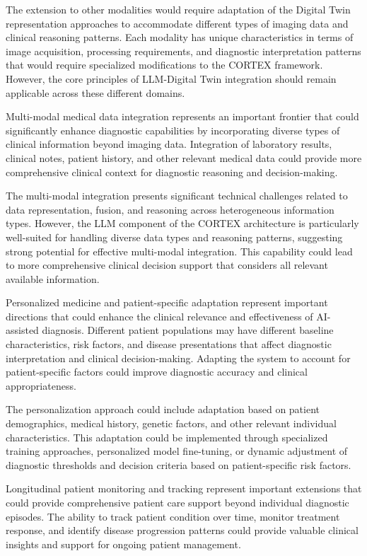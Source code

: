 The extension to other modalities would require adaptation of the Digital Twin representation approaches to accommodate different types of imaging data and clinical reasoning patterns. Each modality has unique characteristics in terms of image acquisition, processing requirements, and diagnostic interpretation patterns that would require specialized modifications to the CORTEX framework. However, the core principles of LLM-Digital Twin integration should remain applicable across these different domains.

Multi-modal medical data integration represents an important frontier that could significantly enhance diagnostic capabilities by incorporating diverse types of clinical information beyond imaging data. Integration of laboratory results, clinical notes, patient history, and other relevant medical data could provide more comprehensive clinical context for diagnostic reasoning and decision-making.

The multi-modal integration presents significant technical challenges related to data representation, fusion, and reasoning across heterogeneous information types. However, the LLM component of the CORTEX architecture is particularly well-suited for handling diverse data types and reasoning patterns, suggesting strong potential for effective multi-modal integration. This capability could lead to more comprehensive clinical decision support that considers all relevant available information.

Personalized medicine and patient-specific adaptation represent important directions that could enhance the clinical relevance and effectiveness of AI-assisted diagnosis. Different patient populations may have different baseline characteristics, risk factors, and disease presentations that affect diagnostic interpretation and clinical decision-making. Adapting the system to account for patient-specific factors could improve diagnostic accuracy and clinical appropriateness.

The personalization approach could include adaptation based on patient demographics, medical history, genetic factors, and other relevant individual characteristics. This adaptation could be implemented through specialized training approaches, personalized model fine-tuning, or dynamic adjustment of diagnostic thresholds and decision criteria based on patient-specific risk factors.

Longitudinal patient monitoring and tracking represent important extensions that could provide comprehensive patient care support beyond individual diagnostic episodes. The ability to track patient condition over time, monitor treatment response, and identify disease progression patterns could provide valuable clinical insights and support for ongoing patient management.

